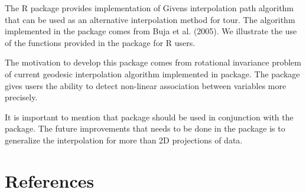 The R package  provides implementation of Givens interpolation path algorithm that can be used as an alternative interpolation method for tour. The algorithm implemented in the  package comes from Buja et al. (2005). We illustrate the use of the functions provided in the package for R users.

The motivation to develop this package comes from rotational invariance problem of current geodesic interpolation algorithm implemented in  package. The package gives users the ability to detect non-linear association between variables more precisely.

It is important to mention that  package should be used in conjunction with the  package. The future improvements that needs to be done in the package is to generalize the interpolation for more than 2D projections of data.

\hypertarget{references}{%
\section*{References}\label{references}}

